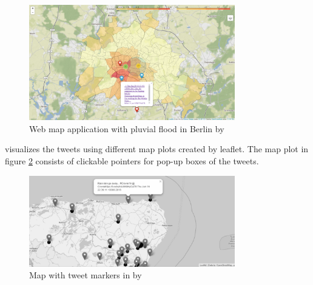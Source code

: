 \begin{figure}[H]
\begin{center}
  \includegraphics[width=0.80\textwidth]{./images/feng.png}
\end{center}
\caption{Web map application with pluvial flood in Berlin by }
\label{fig:feng}
\end{figure}

 visualizes the tweets using different map plots
 created by leaflet. The map plot in figure \ref{fig:baker_marker} consists of clickable pointers for pop-up boxes of the tweets.

\begin{figure}[H]
\begin{center}
  \includegraphics[width=0.8\textwidth]{images/baker_marker.png}
\end{center}
\caption{Map with tweet markers in by }
\label{fig:baker_marker}
\end{figure}

